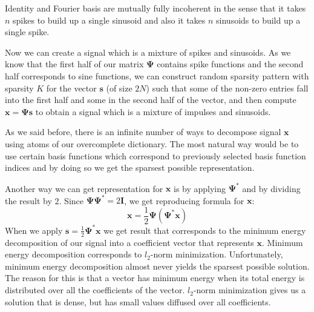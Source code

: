 \documentclass[journal]{IEEEtran}
\begin{document}
Identity and Fourier basis are mutually fully incoherent in the sense that it takes $n$ spikes to build up a single sinusoid and also it takes $n$ sinusoids to build up a single spike.

Now we can create a signal which is a mixture of spikes and sinusoids. As we know that the first half of our matrix $\boldsymbol{\Psi}$ contains spike functions and the second half corresponds to sine functions, we can construct random sparsity pattern with sparsity $K$ for the vector $\boldsymbol{s}$ (of size $2N$) such that some of the non-zero entries fall into the first half and some in the second half of the vector, and then compute $\boldsymbol{x}=\boldsymbol{\Psi} \boldsymbol{s}$ to obtain a signal which is a mixture of impulses and sinusoids.

As we said before, there is an infinite number of ways to decompose signal $\boldsymbol{x}$ using atoms of our overcomplete dictionary. The most natural way would be to use certain basis functions which correspond to previously selected basis function indices and by doing so we get the sparsest possible representation. 

Another way we can get representation for $\boldsymbol{x}$ is by applying $\boldsymbol{\Psi^*}$ and by dividing the result by 2. Since $\boldsymbol{\Psi}\boldsymbol{\Psi^*}=2\boldsymbol{I}$, we get reproducing formula for $\boldsymbol{x}$:
%
\begin{equation}
\boldsymbol{x}=\frac{1}{2}\boldsymbol{\Psi}(\boldsymbol{\Psi^*}\boldsymbol{x})
\end{equation}
When we apply $\boldsymbol{s}=\frac{1}{2}\boldsymbol{\Psi^*}\boldsymbol{x}$ we get result that corresponds to the minimum energy decomposition of our signal into a coefficient vector that represents $\boldsymbol{x}$. Minimum energy decomposition corresponds to $l_2$-norm minimization. Unfortunately, minimum energy decomposition almost never yields the sparsest possible solution. The reason for this is that a vector has minimum energy when its total energy is distributed over all the coefficients of the vector. $l_2$-norm minimization gives us a solution that is dense, but has small values diffused over all coefficients.
\end{document}

